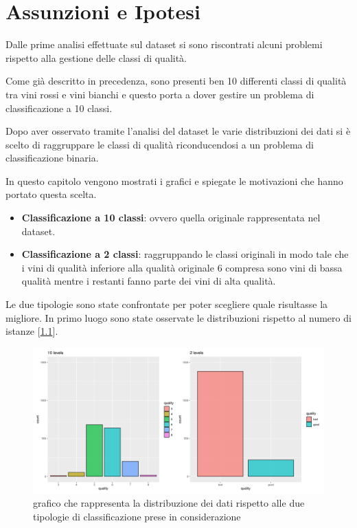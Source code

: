 \chapter{Assunzioni e Ipotesi}
\label{ch:assunzioni}
Dalle prime analisi effettuate sul dataset si sono riscontrati alcuni problemi rispetto alla gestione delle classi di qualità.

\noindent
Come già descritto in precedenza, sono presenti ben 10 differenti classi di qualità tra vini rossi e vini bianchi e questo porta a dover gestire un problema di classificazione a 10 classi.

\noindent
Dopo aver osservato tramite l'analisi del dataset le varie distribuzioni dei dati si è scelto di raggruppare le classi di qualità riconducendosi a un problema di classificazione binaria.

\noindent
In questo capitolo vengono mostrati i grafici e spiegate le motivazioni che hanno portato questa scelta.

\begin{itemize}
    \item \textbf{Classificazione a 10 classi}: ovvero quella originale rappresentata nel dataset.
    \item \textbf{Classificazione a 2 classi}: raggruppando le classi originali in modo tale che i vini di qualità inferiore alla qualità originale 6 compresa sono vini di bassa qualità mentre i restanti fanno parte dei vini di alta qualità.
\end{itemize}

\noindent
Le due tipologie sono state confrontate per poter scegliere quale risultasse la migliore. In primo luogo sono state osservate le distribuzioni rispetto al numero di istanze [\ref{fig:quality_different_class}].

\newpage

\begin{figure}[H]
    \centering
    \includegraphics[width=\textwidth]{images/analisi/class_hist_binary.png}
    \caption{grafico che rappresenta la distribuzione dei dati rispetto alle due tipologie di classificazione prese in considerazione}
    \label{fig:quality_different_class}
\end{figure}

